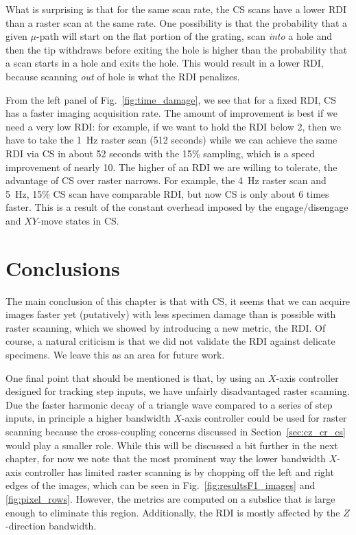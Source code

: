 \documentclass[twocolumn,oneside]{IEEEtran/IEEEtran}
\begin{document}
What is surprising is that for the same scan rate, the CS scans have a lower RDI
than a raster scan at the same rate. One possibility is that the probability
that a given $\mu$-path will start on the flat portion of the grating, scan
\textit{into} a hole and then the tip withdraws before exiting the hole is
higher than the probability that a scan starts in a hole and exits the hole.
This would result in a lower RDI, because scanning \textit{out} of hole is what
the RDI penalizes.

From the left panel of Fig.~\ref{fig:time_damage}, we see that for a fixed RDI,
CS has a faster imaging acquisition rate. The amount of improvement is best if
we need a very low RDI: for example, if we want to hold the RDI below 2, then we
have to take the 1~Hz raster scan (512 seconds) while we can achieve the same
RDI via CS in about 52 seconds with the 15\% sampling, which is a speed
improvement of nearly 10. The higher of an RDI we are willing to tolerate, the
advantage of CS over raster narrows. For example, the 4~Hz raster scan and 5~Hz,
15\% CS scan have comparable RDI, but now CS is only about 6 times faster. This
is a result of the constant overhead imposed by the engage/disengage and
$XY$-move states in CS.

\section{Conclusions}\label{sec:conclusions}
The main conclusion of this chapter is that with CS, it seems that we can
acquire images faster yet (putatively) with less specimen damage than is
possible with raster scanning, which we showed by introducing a new metric, the
RDI. Of course, a natural criticism is that we did not validate the RDI against
delicate specimens. We leave this as an area for future work.




One final point that should be mentioned is that, by using an $X$-axis
controller designed for tracking step inputs, we have unfairly disadvantaged
raster scanning. Due the faster harmonic decay of a triangle wave compared to a
series of step inputs, in principle a higher bandwidth $X$-axis controller could
be used for raster scanning because the cross-coupling concerns discussed in
Section~\ref{sec:cz_cr_cs} would play a smaller role. While this will be
discussed a bit further in the next chapter, for now we note that the most
prominent way the lower bandwidth $X$-axis controller has limited raster
scanning is by chopping off the left and right edges of the images, which can be
seen in Fig.~\ref{fig:resultsF1_images} and \ref{fig:pixel_rows}. However, the
metrics are computed on a subslice that is large enough to eliminate this
region. Additionally, the RDI is mostly affected by the $Z$-direction bandwidth.
    



\end{document}
